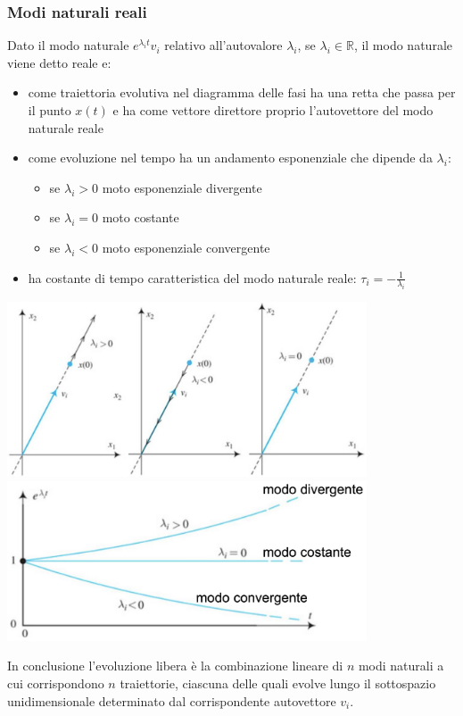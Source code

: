 \subsubsection*{Modi naturali reali}
Dato il modo naturale \(e^{\lambda_i t} v_i\) relativo all'autovalore \(\lambda_i\), se \(\lambda_i \in \mathbb{R}\), il modo
naturale viene detto reale e:
\begin{center}
	\begin{minipage}{0.5\textwidth}
		\begin{itemize}
			\item come traiettoria evolutiva nel diagramma delle fasi ha una retta che passa per il punto \(x(t)\) e ha come vettore
			direttore proprio l'autovettore del modo naturale reale
			\item come evoluzione nel tempo ha un andamento esponenziale che dipende da \(\lambda_i\):
			\begin{itemize}
				\item se \(\lambda_i > 0\) moto esponenziale divergente
				\item se \(\lambda_i = 0\) moto costante 
				\item se \(\lambda_i < 0\) moto esponenziale convergente
			\end{itemize}
			\item ha costante di tempo caratteristica del modo naturale reale: \(\displaystyle\tau_i = -\frac{1}{\lambda_i}\)
		\end{itemize}
	\end{minipage}
	\begin{minipage}{0.49\textwidth}
		\centering
		\includegraphics[width=0.8\textwidth]{immagini/evoluzione libera reale 1.png}
		\includegraphics[width=0.8\textwidth]{immagini/evoluzione libera reale 2.png}
	\end{minipage}
\end{center}
In conclusione l’evoluzione libera è la combinazione lineare di \(n\) modi naturali a cui corrispondono \(n\) traiettorie,
ciascuna delle quali evolve lungo il sottospazio unidimensionale determinato dal corrispondente autovettore \(v_i\).

